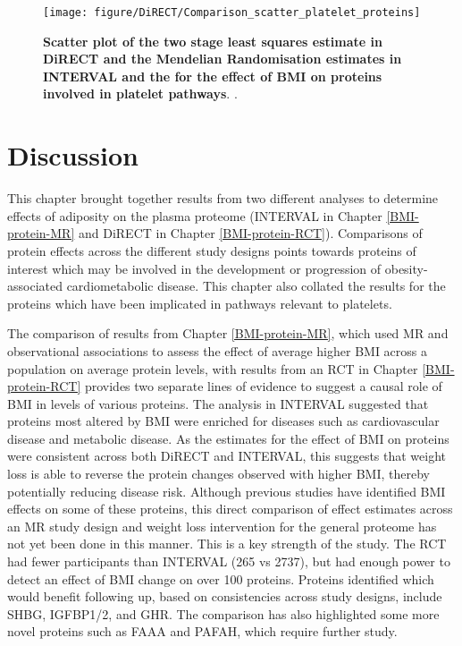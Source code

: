 \documentclass[11pt,twoside]{bristolthesis}
\begin{document}
\begin{figure}
\texttt{[image: figure/DiRECT/Comparison\_scatter\_platelet\_proteins]} \caption[Scatter plot of the two stage least squares estimate in DiRECT and the Mendelian Randomisation estimates in INTERVAL and the for the effect of BMI on proteins involved in platelet pathways]{\textbf{Scatter plot of the two stage least squares estimate in DiRECT and the Mendelian Randomisation estimates in INTERVAL and the for the effect of BMI on proteins involved in platelet pathways}. .}\label{fig:DiRECT-INTERVAL-platelet}
\end{figure}
\hypertarget{discussion-5}{%
\section{Discussion}\label{discussion-5}}

This chapter brought together results from two different analyses to determine effects of adiposity on the plasma proteome (INTERVAL in Chapter \ref{BMI-protein-MR} and DiRECT in Chapter \ref{BMI-protein-RCT}). Comparisons of protein effects across the different study designs points towards proteins of interest which may be involved in the development or progression of obesity-associated cardiometabolic disease. This chapter also collated the results for the proteins which have been implicated in pathways relevant to platelets.

The comparison of results from Chapter \ref{BMI-protein-MR}, which used MR and observational associations to assess the effect of average higher BMI across a population on average protein levels, with results from an RCT in Chapter \ref{BMI-protein-RCT} provides two separate lines of evidence to suggest a causal role of BMI in levels of various proteins. The analysis in INTERVAL suggested that proteins most altered by BMI were enriched for diseases such as cardiovascular disease and metabolic disease. As the estimates for the effect of BMI on proteins were consistent across both DiRECT and INTERVAL, this suggests that weight loss is able to reverse the protein changes observed with higher BMI, thereby potentially reducing disease risk. Although previous studies have identified BMI effects on some of these proteins, this direct comparison of effect estimates across an MR study design and weight loss intervention for the general proteome has not yet been done in this manner. This is a key strength of the study. The RCT had fewer participants than INTERVAL (265 vs 2737), but had enough power to detect an effect of BMI change on over 100 proteins. Proteins identified which would benefit following up, based on consistencies across study designs, include SHBG, IGFBP1/2, and GHR. The comparison has also highlighted some more novel proteins such as FAAA and PAFAH, which require further study.
\end{document}
